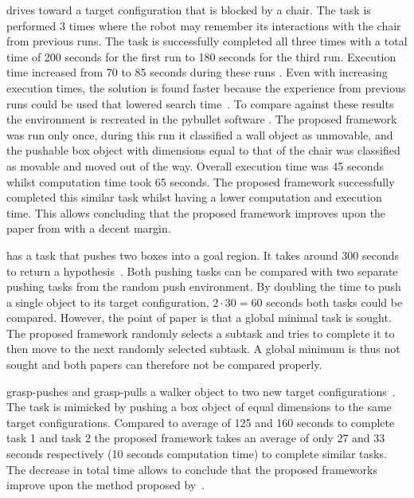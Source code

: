 \citeauthor{wang_affordancebased_2020} drives toward a target configuration that is blocked by a chair.  The task is performed 3 times where the robot may remember its interactions with the chair from previous runs. The task is successfully completed all three times with a total time of 200 seconds for the first run to 180 seconds for the third run. Execution time increased from 70 to 85 seconds during these runs . Even with increasing execution times, the solution is found faster because the experience from previous runs could be used that lowered search time~\cite{wang_affordancebased_2020}. To compare against these results the environment is recreated in the pybullet software . The proposed framework was run only once, during this run it classified a wall object as unmovable, and the pushable box object with dimensions equal to that of the chair was classified as movable and moved out of the way. Overall execution time was 45 seconds whilst computation time took 65 seconds. The proposed framework successfully completed this similar task whilst having a lower computation and execution time. This allows concluding that the proposed framework improves upon the paper from \citeauthor{wang_affordancebased_2020} with a decent margin.\bs
{}

\citeauthor{vega-brown_asymptotically_2020} has a task that pushes two boxes into a goal region. It takes around 300 seconds to return a hypothesis~\cite{vega-brown_asymptotically_2020}. Both pushing tasks can be compared with two separate pushing tasks from the random push environment. By doubling the time to push a single object to its target configuration, $2 \cdot 30 = 60$ seconds both tasks could be compared. However, the point of \citeauthor{vega-brown_asymptotically_2020} paper is that a global minimal task is sought. The proposed framework randomly selects a subtask and tries to complete it to then move to the next randomly selected subtask. A global minimum is thus not sought and both papers can therefore not be compared properly.\bs

\citeauthor{sabbaghnovin_model_2021} grasp-pushes and grasp-pulls a walker object to two new target configurations~\cite{sabbaghnovin_model_2021}. The task is mimicked by pushing a box object of equal dimensions to the same target configurations. Compared to \citeauthor{sabbaghnovin_model_2021} average of 125 and 160 seconds to complete task 1 and task 2 the proposed framework takes an average of only 27 and 33 seconds respectively (10 seconds computation time) to complete similar tasks. The decrease in total time allows to conclude that the proposed frameworks improve upon the method proposed by~\citeauthor{sabbaghnovin_model_2021}.\bs {}

